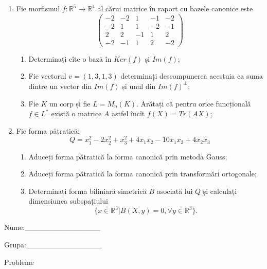 \documentclass{article}
\begin{document}
\begin{enumerate}
 \item Fie morfismul $f:\mathbb{R}^5 \to \mathbb{R}^4$ al cărui matrice în raport cu bazele canonice este
$$\begin{pmatrix}
-2&-2&1&-1&-2\\
-2&1&1&-2&-1\\
2&2&-1&1&2\\
-2&-1&1&2&-2
\end{pmatrix}$$

\begin{enumerate}
\item Determinați cîte o bază în $Ker(f)$ și $Im(f)$;
\item Fie vectorul $v=(1,3,1,3)$ determinați descompunerea acestuia ca suma dintre un vector din $Im(f)$ și unul din $Im(f)^\perp$;
\item Fie $K$ un corp și fie $L=M_n(K)$. Arătați că pentru orice funcțională $f \in L^*$ există o matrice $A$ astfel încît $f(X)=Tr(AX)$;
\end{enumerate}
\item Fie forma pătratică:
$$Q= x_1^2-2x_2^2+x_3^2+4x_1x_2-10x_1x_3+4x_2x_3$$

\begin{enumerate}
\item Aduceți forma pătratică la forma canonică prin metoda Gauss;
\item Aduceți forma pătratică la forma canonică prin transformări ortogonale;
\item Determinați forma biliniară simetrică $B$ asociată lui $Q$ și calculați dimensiunea subspațiului
$$\{x \in \mathbb{R}^3 | B(X,y)=0,\forall y \in \mathbb{R}^3\}.$$

\end{enumerate}
\end{enumerate}
\newpage
\begin{flushright}
Nume:\_\_\_\_\_\_\_\_\_\_\_\_\_\_
 
 
Grupa:\_\_\_\_\_\_\_\_\_\_\_\_\_\_
\end{flushright}
\begin{center}
\vspace{2cm}
{\Large Probleme}
\vspace{2cm}
\end{center}
\end{document}
